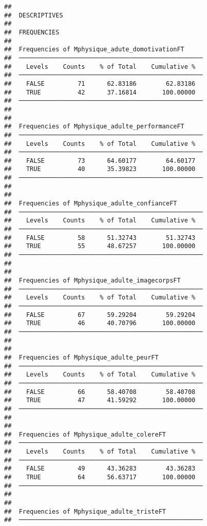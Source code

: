 \documentclass[
]{article}
\begin{document}
\begin{verbatim}
## 
##  DESCRIPTIVES
## 
##  FREQUENCIES
## 
##  Frequencies of Mphysique_adute_domotivationFT      
##  ────────────────────────────────────────────────── 
##    Levels    Counts    % of Total    Cumulative %   
##  ────────────────────────────────────────────────── 
##    FALSE         71      62.83186        62.83186   
##    TRUE          42      37.16814       100.00000   
##  ────────────────────────────────────────────────── 
## 
## 
##  Frequencies of Mphysique_adulte_performanceFT      
##  ────────────────────────────────────────────────── 
##    Levels    Counts    % of Total    Cumulative %   
##  ────────────────────────────────────────────────── 
##    FALSE         73      64.60177        64.60177   
##    TRUE          40      35.39823       100.00000   
##  ────────────────────────────────────────────────── 
## 
## 
##  Frequencies of Mphysique_adulte_confianceFT        
##  ────────────────────────────────────────────────── 
##    Levels    Counts    % of Total    Cumulative %   
##  ────────────────────────────────────────────────── 
##    FALSE         58      51.32743        51.32743   
##    TRUE          55      48.67257       100.00000   
##  ────────────────────────────────────────────────── 
## 
## 
##  Frequencies of Mphysique_adulte_imagecorpsFT       
##  ────────────────────────────────────────────────── 
##    Levels    Counts    % of Total    Cumulative %   
##  ────────────────────────────────────────────────── 
##    FALSE         67      59.29204        59.29204   
##    TRUE          46      40.70796       100.00000   
##  ────────────────────────────────────────────────── 
## 
## 
##  Frequencies of Mphysique_adulte_peurFT             
##  ────────────────────────────────────────────────── 
##    Levels    Counts    % of Total    Cumulative %   
##  ────────────────────────────────────────────────── 
##    FALSE         66      58.40708        58.40708   
##    TRUE          47      41.59292       100.00000   
##  ────────────────────────────────────────────────── 
## 
## 
##  Frequencies of Mphysique_adulte_colereFT           
##  ────────────────────────────────────────────────── 
##    Levels    Counts    % of Total    Cumulative %   
##  ────────────────────────────────────────────────── 
##    FALSE         49      43.36283        43.36283   
##    TRUE          64      56.63717       100.00000   
##  ────────────────────────────────────────────────── 
## 
## 
##  Frequencies of Mphysique_adulte_tristeFT           
##  ────────────────────────────────────────────────── 

\end{verbatim}
\end{document}
